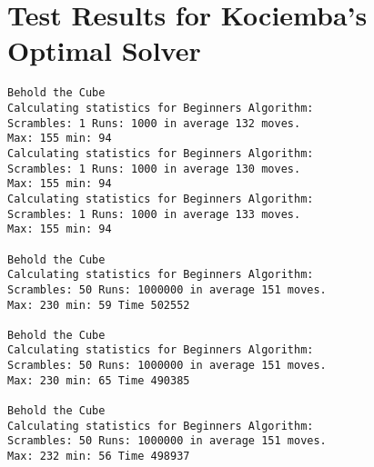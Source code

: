 \chapter{Test Results for Kociemba's Optimal Solver}
\label{chap:kociembaResults}
\emptyTop{}
\begin{lstlisting}[breaklines=true, basicstyle=\ttfamily\footnotesize]
Behold the Cube
Calculating statistics for Beginners Algorithm:
Scrambles: 1 Runs: 1000 in average 132 moves. 
Max: 155 min: 94
Calculating statistics for Beginners Algorithm:
Scrambles: 1 Runs: 1000 in average 130 moves. 
Max: 155 min: 94
Calculating statistics for Beginners Algorithm:
Scrambles: 1 Runs: 1000 in average 133 moves. 
Max: 155 min: 94

Behold the Cube
Calculating statistics for Beginners Algorithm:
Scrambles: 50 Runs: 1000000 in average 151 moves. 
Max: 230 min: 59 Time 502552

Behold the Cube
Calculating statistics for Beginners Algorithm:
Scrambles: 50 Runs: 1000000 in average 151 moves. 
Max: 230 min: 65 Time 490385

Behold the Cube
Calculating statistics for Beginners Algorithm:
Scrambles: 50 Runs: 1000000 in average 151 moves. 
Max: 232 min: 56 Time 498937
\end{lstlisting}